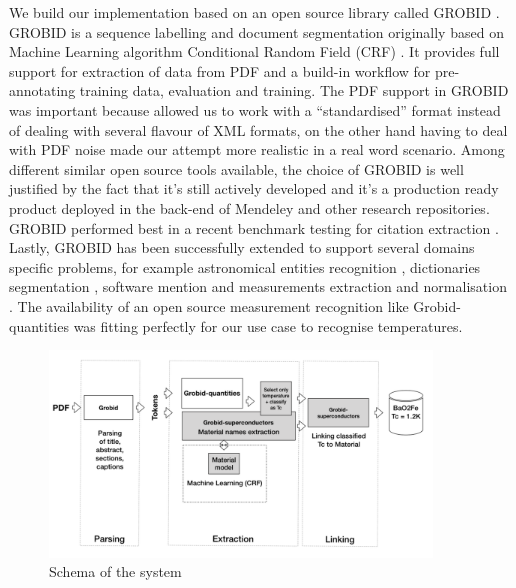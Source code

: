 \documentclass{article}[a4]
\begin{document}

We build our implementation based on an open source library called GROBID \cite{GROBID}. GROBID is a sequence labelling and document segmentation originally based on Machine Learning algorithm Conditional Random Field (CRF) \cite{lafferty2001conditional}. It provides full support for extraction of data from PDF and a build-in workflow for pre-annotating training data, evaluation and training. 
The PDF support in GROBID was important because allowed us to work with a “standardised” format instead of dealing with several flavour of XML formats, on the other hand having to deal with PDF noise made our attempt more realistic in a real word scenario. Among different similar open source tools available, the choice of GROBID is well justified by the fact that it's still actively developed and it's a production ready product deployed in the back-end of Mendeley \cite{mendeley-extraction} and other research repositories. GROBID performed best in a recent benchmark testing for citation extraction \cite{DBLP:journals/corr/abs-1802-01168}. Lastly, GROBID has been successfully extended to support several domains specific problems, for example astronomical entities recognition \cite{grobid-astro}, dictionaries segmentation \cite{khemakhem2017automatic}, software mention \cite{software-mentions} and measurements extraction and normalisation \cite{grobid-quantities}. The availability of an open source measurement recognition like Grobid-quantities was fitting perfectly for our use case to recognise temperatures. 

\begin{figure}[]
    \centering
    \includegraphics[width=4in]{schema}
    \caption[Schema of the system] {Schema of the system}
    \label{fig:system-schema}
\end{figure}
\end{document}
